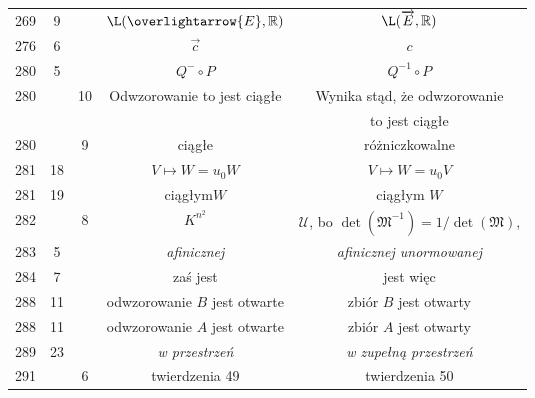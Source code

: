 \documentclass[a4paper,11pt]{article}
\newcommand{\ora}{\overrightarrow}
\newcommand{\ola}{\overlightarrow}
\begin{document}
\begin{center}
\begin{tabular}{|c|c|c|c|c|}
    269 &  9 & & $\L( \ola{ E }, \R )$
           & $\L( \ora{ E }, \R )$ \\
    276 &  6 & & $\vec{ c }$ & $c$ \\
    280 &  5 & & $Q^{ - } \circ P$ & $Q^{ -1 } \circ P$ \\
    280 & & 10 & Odwzorowanie to jest ciągłe & Wynika stąd,
                                               że odwzorowanie \\
    & & & & to jest ciągłe \\
    280 & &  9 & ciągłe & różniczkowalne \\
    281 & 18 & & $V \mapsto W = u_{ 0 } W$ & $V \mapsto W = u_{ 0 } V$ \\
    281 & 19 & & ciągłym$W$ & ciągłym $W$ \\
    282 & &  8 & $K^{ n^{ 2 } }$
           & $\mathcal{U}$, bo $\det( \mathfrak{M}^{ -1 } )
             = 1/\det( \mathfrak{M} )$, \\
    283 &  5 & & \emph{afinicznej} & \emph{afinicznej unormowanej} \\
    284 &  7 & & zaś jest & jest więc \\
    288 & 11 & & odwzorowanie $B$ jest otwarte & zbiór $B$ jest otwarty \\
    288 & 11 & & odwzorowanie $A$ jest otwarte & zbiór $A$ jest otwarty \\
    289 & 23 & & \emph{w przestrzeń} & \emph{w zupełną przestrzeń} \\
    291 & &  6 & twierdzenia 49 & twierdzenia 50 \\
    \hline
  \end{tabular}


\end{center}
\end{document}
